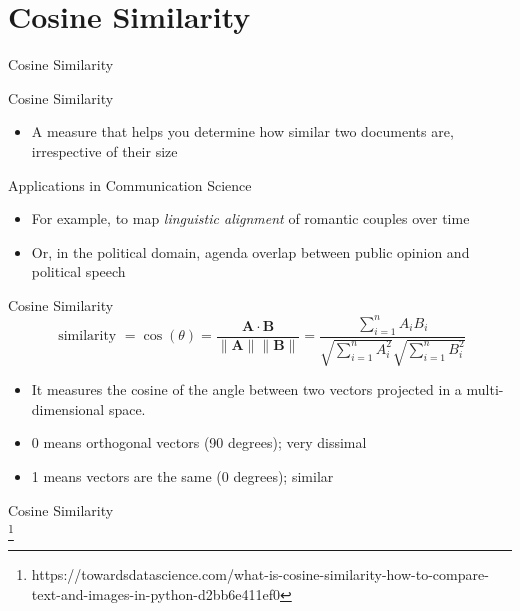 

\section{Cosine Similarity}

\begin{frame}{Cosine Similarity}
	\begin{block}{Cosine Similarity}
		\begin{itemize}[<+>]
			\item A measure that helps you determine how similar two documents are, irrespective of their size
		\end{itemize}
	
		\begin{exampleblock}{Applications in Communication Science}
		\begin{itemize}[<+>]
			\item For example, to map \emph{linguistic alignment} of romantic couples over time \textcite{Brinberg2021} 
			\item Or, in the political domain, agenda overlap between public opinion and political speech \textcite{Hager2020}
		\end{itemize}
	\end{exampleblock}
	\end{block}
\end{frame}

\begin{frame}{Cosine Similarity} 
$$
\text { similarity }=\cos (\theta)=\frac{\mathbf{A} \cdot \mathbf{B}}{\|\mathbf{A}\|\|\mathbf{B}\|}=\frac{\sum_{i=1}^{n} A_{i} B_{i}}{\sqrt{\sum_{i=1}^{n} A_{i}^{2}} \sqrt{\sum_{i=1}^{n} B_{i}^{2}}}
$$

\pause

\begin{itemize}[<+>]
\item It measures the cosine of the angle between two vectors projected in a multi-dimensional space.
\item 0 means orthogonal vectors (90 degrees); very dissimal
\item 1 means vectors are the same (0 degrees); similar
\end{itemize}
\end{frame}


\begin{frame}{Cosine Similarity}
	\\
\footnote{https://towardsdatascience.com/what-is-cosine-similarity-how-to-compare-text-and-images-in-python-d2bb6e411ef0}
\end{frame}




